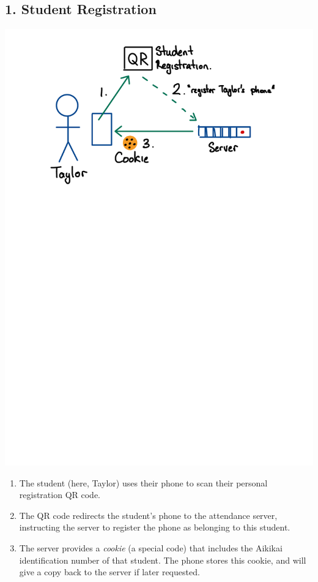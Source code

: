 \documentclass{report}
\begin{document}
\subsection*{1. Student Registration}
\begin{center}
\includegraphics[scale=0.4]{figure/fig-student-registration.pdf}
\end{center}

\begin{enumerate}
\item The student (here, Taylor) uses their phone to scan their personal
      registration QR code.

\item The QR code redirects the student's phone to the attendance server,
      instructing the server to register the phone as belonging to this student.

\item The server provides a \emph{cookie} (a special code) that includes
      the Aikikai identification number of that student. The phone stores
      this cookie, and will give a copy back to the server if later requested.
\end{enumerate}
\end{document}
